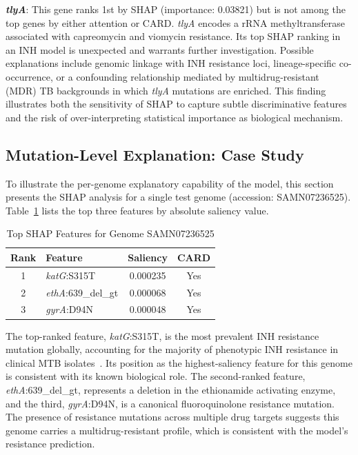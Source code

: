 \documentclass[conference]{IEEEtran}
\begin{document}
\textbf{\textit{tlyA}}: This gene ranks 1st by SHAP (importance: 0.03821) but is not among the top genes by either attention or CARD. \textit{tlyA} encodes a rRNA methyltransferase associated with capreomycin and viomycin resistance. Its top SHAP ranking in an INH model is unexpected and warrants further investigation. Possible explanations include genomic linkage with INH resistance loci, lineage-specific co-occurrence, or a confounding relationship mediated by multidrug-resistant (MDR) TB backgrounds in which \textit{tlyA} mutations are enriched. This finding illustrates both the sensitivity of SHAP to capture subtle discriminative features and the risk of over-interpreting statistical importance as biological mechanism.

\subsection{Mutation-Level Explanation: Case Study}

To illustrate the per-genome explanatory capability of the model, this section presents the SHAP analysis for a single test genome (accession: SAMN07236525). Table~\ref{tab:shap_example} lists the top three features by absolute saliency value.

\begin{table}[t]
\centering
\caption{Top SHAP Features for Genome SAMN07236525}
\label{tab:shap_example}
\begin{tabular}{clcc}
\toprule
\textbf{Rank} & \textbf{Feature} & \textbf{Saliency} & \textbf{CARD} \\
\midrule
1 & \textit{katG}:S315T       & 0.000235 & Yes \\
2 & \textit{ethA}:639\_del\_gt & 0.000068 & Yes \\
3 & \textit{gyrA}:D94N        & 0.000048 & Yes \\
\bottomrule
\end{tabular}
\end{table}

The top-ranked feature, \textit{katG}:S315T, is the most prevalent INH resistance mutation globally, accounting for the majority of phenotypic INH resistance in clinical MTB isolates~\cite{ref_katg}. Its position as the highest-saliency feature for this genome is consistent with its known biological role. The second-ranked feature, \textit{ethA}:639\_del\_gt, represents a deletion in the ethionamide activating enzyme, and the third, \textit{gyrA}:D94N, is a canonical fluoroquinolone resistance mutation. The presence of resistance mutations across multiple drug targets suggests this genome carries a multidrug-resistant profile, which is consistent with the model's resistance prediction.
\end{document}
